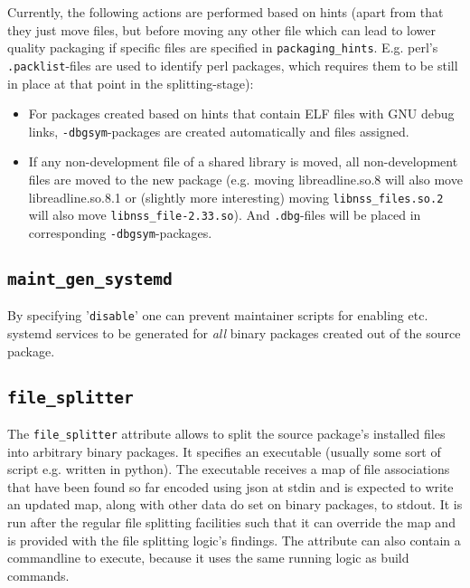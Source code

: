 \documentclass[a4paper]{scrartcl}
\newcommand{\file}[1]{\texttt{#1}}
\begin{document}
	Currently, the following actions are performed based on hints (apart from that they just move files, but before moving any other file which can lead to lower quality packaging if specific files are specified in \texttt{packaging\_hints}. E.g. perl's \file{.packlist}-files are used to identify perl packages, which requires them to be still in place at that point in the splitting-stage):
	
	\begin{itemize}
		\item For packages created based on hints that contain ELF files with GNU debug links, \texttt{-dbgsym}-packages are created automatically and files assigned.
		
		\item If any non-development file of a shared library is moved, all non-development files are moved to the new package (e.g. moving libreadline.so.8 will also move libreadline.so.8.1 or (slightly more interesting) moving \file{libnss\_files.so.2} will also move \file{libnss\_file-2.33.so}). And \file{.dbg}-files will be placed in corresponding \texttt{-dbgsym}-packages.
	\end{itemize}

	\subsection{\texttt{maint\_gen\_systemd}}
	\label{sec:maint_gen_systemd}
	
	By specifying '\texttt{disable}' one can prevent maintainer scripts for enabling etc. systemd services to be generated for \textit{all} binary packages created out of the source package.
	
	
	\subsection{\texttt{file\_splitter}}
	\label{sec:file_splitter}
	
	The \texttt{file\_splitter} attribute allows to split the source package's installed files into arbitrary binary packages. It specifies an executable (usually some sort of script e.g. written in python). The executable receives a map of file associations that have been found so far encoded using json at stdin and is expected to write an updated map, along with other data do set on binary packages, to stdout. It is run after the regular file splitting facilities such that it can override the map and is provided with the file splitting logic's findings. The attribute can also contain a commandline to execute, because it uses the same running logic as build commands.
	
\end{document}
